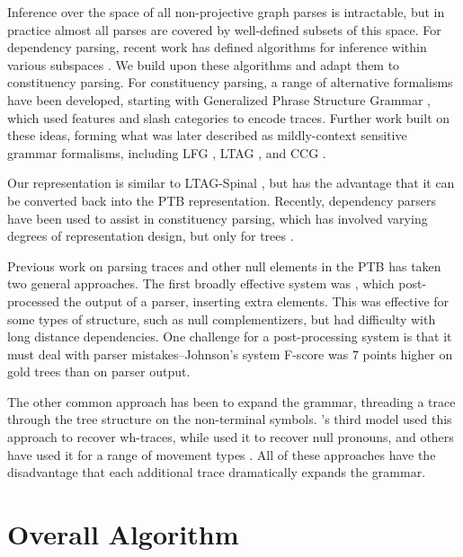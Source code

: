 Inference over the space of all non-projective graph parses is intractable, but in practice almost all parses are covered by well-defined subsets of this space.
For dependency parsing, recent work has defined algorithms for inference within various subspaces \parencite{Gomez-Rodriguez:2010,ec}.
We build upon these algorithms and adapt them to constituency parsing.
For constituency parsing, a range of alternative formalisms have been developed, starting with Generalized Phrase Structure Grammar \parencite{gpsg}, which used features and slash categories to encode traces.
Further work built on these ideas, forming what was later described as mildly-context sensitive grammar formalisms, including LFG \parencite{Bresnan:1982}, LTAG \parencite{Joshi:1997}, and CCG \parencite{Steedman:2000}.

Our representation is similar to LTAG-Spinal \parencite{Shen:2007}, but has the advantage that it can be converted back into the PTB representation.
Recently, dependency parsers have been used to assist in constituency parsing, which has involved varying degrees of representation design, but only for trees \parencite{hall2007hybrid,hall-nivre:2008:PaGe,kong-rush-smith:2015:NAACL-HLT,fernandezgonzalez-martins:2015:ACL-IJCNLP}.

Previous work on parsing traces and other null elements in the PTB has taken two general approaches.
The first broadly effective system was \textcite{Johnson:2002}, which post-processed the output of a parser, inserting extra elements.
This was effective for some types of structure, such as null complementizers, but had difficulty with long distance dependencies.
One challenge for a post-processing system is that it must deal with parser mistakes--Johnson's system F-score was $7$ points higher on gold trees than on parser output.

The other common approach has been to expand the grammar, threading a trace through the tree structure on the non-terminal symbols.
\textcite{Collins:1997}'s third model used this approach to recover wh-traces, while \textcite{cai-chiang-goldberg:2011} used it to recover null pronouns, and others have used it for a range of movement types \parencite{dienes-dubey:2003,schmid:2006}.
All of these approaches have the disadvantage that each additional trace dramatically expands the grammar.

\section{Overall Algorithm} \label{sec:overall-algorithm}

